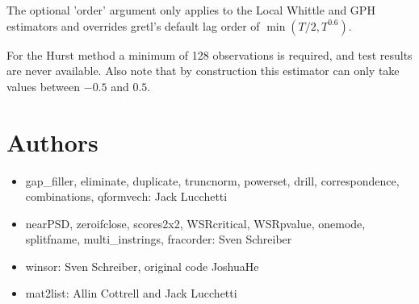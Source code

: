 \documentclass[11pt,english]{article}
\begin{document}
The optional 'order' argument only applies to the Local Whittle and GPH estimators and
overrides gretl's default lag order of $\min(T/2, T^{0.6})$.

For the Hurst method a minimum of 128 observations is required, and test results are
never available. Also note that by construction this estimator can only take values between
$-0.5$ and $0.5$.

\section{Authors}
\begin{itemize}
\item gap\_filler, eliminate, duplicate, truncnorm, powerset,
  drill, correspondence, combinations, qformvech: Jack Lucchetti

\item nearPSD, zeroifclose, scores2x2, WSRcritical, WSRpvalue, onemode,
splitfname, multi\_instrings, fracorder:
Sven Schreiber

\item winsor: Sven Schreiber, original code JoshuaHe

\item mat2list: Allin Cottrell and Jack Lucchetti

\end{itemize}
\end{document}
